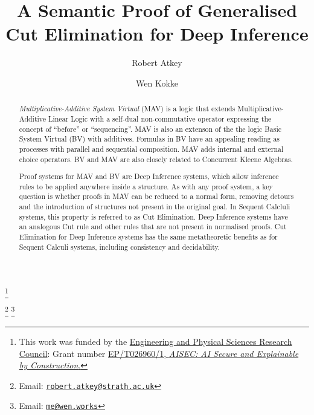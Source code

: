\documentclass[twoside,11pt]{entics}
\begin{document}
\begin{frontmatter}
  \title{A Semantic Proof of Generalised Cut Elimination for Deep Inference}
  \thanks[ALL]{This work
    was funded by the \href{https://www.ukri.org/about-us/epsrc/}{Engineering and Physical
      Sciences Research
      Council}: Grant number
    \href{https://gow.epsrc.ukri.org/NGBOViewGrant.aspx?GrantRef=EP/T026960/1}{EP/T026960/1, \emph{AISEC: AI Secure and
        Explainable by Construction}.}}
  \author{Robert Atkey}
  \author{Wen Kokke}
  \address[msp]{%
    Mathematically Structured Programming Group\\
    Computer and Information Sciences\\
    University of Strathclyde\\
    Glasgow, Scotland, UK}
  \thanks[bobemail]%
  {Email: \href{robert.atkey@strath.ac.uk}%
    {\texttt{\normalshape robert.atkey@strath.ac.uk}}}
  \thanks[wenemail]%
  {Email: \href{me@wen.works}%
    {\texttt{\normalshape me@wen.works}}}
  \begin{abstract}
    \emph{Multiplicative-Additive System Virtual} (MAV) is a logic
    that extends Multiplicative-Additive Linear Logic with a self-dual
    non-commutative operator expressing the concept of ``before'' or
    ``sequencing''. MAV is also an extenson of the the logic Basic
    System Virtual (BV) with additives. Formulas in BV have an
    appealing reading as processes with parallel and sequential
    composition. MAV adds internal and external choice operators. BV
    and MAV are also closely related to Concurrent Kleene Algebras.
    
    Proof systems for MAV and BV are Deep Inference systems, which
    allow inference rules to be applied anywhere inside a
    structure. As with any proof system, a key question is whether
    proofs in MAV can be reduced to a normal form, removing detours
    and the introduction of structures not present in the original
    goal. In Sequent Calcluli systems, this property is referred to as
    Cut Elimination. Deep Inference systems have an analogous Cut rule
    and other rules that are not present in normalised proofs. Cut
    Elimination for Deep Inference systems has the same metatheoretic
    benefits as for Sequent Calculi systems, including consistency and
    decidability.
    

\end{abstract}
\end{frontmatter}
\end{document}
